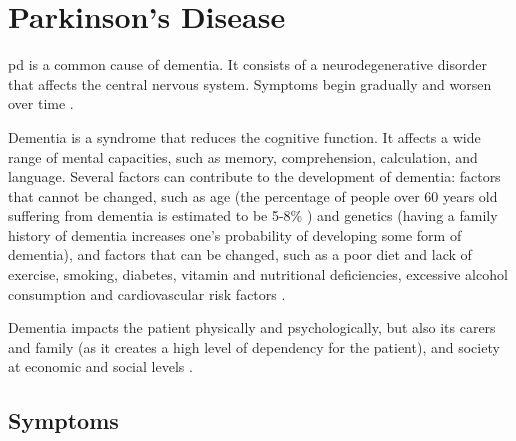 
\chapter{Parkinson's Disease}
\label{ch:facere}





\gls{pd} is a common cause of dementia. It consists of a neurodegenerative disorder that affects the central nervous system. Symptoms begin gradually and worsen over time \cite{parkinson}.

Dementia is a syndrome that reduces the cognitive function. It affects a wide range of mental capacities, such as memory, comprehension, calculation, and language. Several factors can contribute to the development of dementia: factors that cannot be changed, such as age (the percentage of people over 60 years old suffering from dementia is estimated to be 5-8\% \cite{dementia_who}) and genetics (having a family history of dementia increases one's probability of developing some form of dementia), and factors that can be changed, such as a poor diet and lack of exercise, smoking, diabetes, vitamin and nutritional deficiencies, excessive alcohol consumption and cardiovascular risk factors \cite{dementia_mayo}. 

Dementia impacts the patient physically and psychologically, but also its carers and family (as it creates a high level of dependency for the patient), and society at economic and social levels \cite{dementia_who}.


\section{Symptoms}

